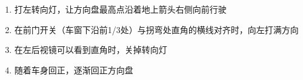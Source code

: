 \begin{enumerate}
    \item 打左转向灯，让方向盘最高点沿着地上箭头右侧向前行驶
    \item 在前门开关（车窗下沿前1/3处）与拐弯处直角的横线对齐时，向左打满方向
    \item 在左后视镜可以看到直角时，关掉转向灯
    \item 随着车身回正，逐渐回正方向盘
\end{enumerate}